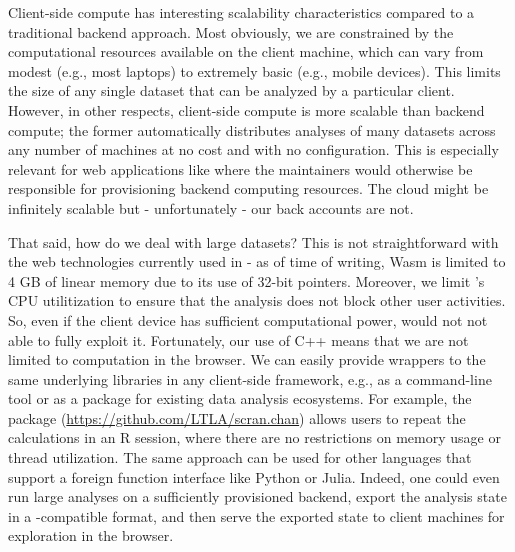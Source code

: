 \documentclass{article}
\begin{document}
Client-side compute has interesting scalability characteristics compared to a traditional backend approach.
Most obviously, we are constrained by the computational resources available on the client machine,
which can vary from modest (e.g., most laptops) to extremely basic (e.g., mobile devices).
This limits the size of any single dataset that can be analyzed by a particular client.
However, in other respects, client-side compute is more scalable than backend compute;
the former automatically distributes analyses of many datasets across any number of machines at no cost and with no configuration.
This is especially relevant for web applications like  where the maintainers would otherwise be responsible for provisioning backend computing resources.
The cloud might be infinitely scalable but - unfortunately - our back accounts are not.

That said, how do we deal with large datasets?
This is not straightforward with the web technologies currently used in  - 
as of time of writing, Wasm is limited to 4 GB of linear memory due to its use of 32-bit pointers.
Moreover, we limit 's CPU utilitization to ensure that the analysis does not block other user activities.
So, even if the client device has sufficient computational power,  would not not able to fully exploit it.
Fortunately, our use of C++ means that we are not limited to computation in the browser.
We can easily provide wrappers to the same underlying libraries in any client-side framework, e.g., as a command-line tool or as a package for existing data analysis ecosystems.
For example, the  package (\url{https://github.com/LTLA/scran.chan}) allows users to repeat the  calculations in an R session,
where there are no restrictions on memory usage or thread utilization.
The same approach can be used for other languages that support a foreign function interface like Python or Julia.
Indeed, one could even run large analyses on a sufficiently provisioned backend, 
export the analysis state in a -compatible format,
and then serve the exported state to client machines for exploration in the browser. 



\end{document}
